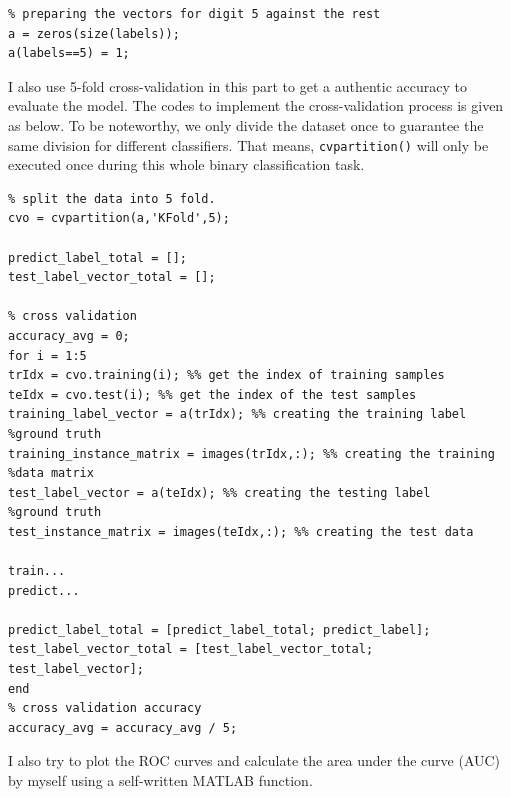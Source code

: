 \documentclass[a4paper,12pt]{article} %
\begin{document}
\begin{footnotesize}
\begin{verbatim}
% preparing the vectors for digit 5 against the rest
a = zeros(size(labels));
a(labels==5) = 1;
\end{verbatim}
\end{footnotesize}

\hspace{0.7cm}
I also use 5-fold cross-validation in this part to get a authentic accuracy to evaluate the model. The codes to implement the cross-validation process is given as below. To be noteworthy, we only divide the dataset once to guarantee the same division for different classifiers. That means, \texttt{cvpartition()} will only be executed once during this whole binary classification task.

\begin{footnotesize}
\begin{verbatim}
% split the data into 5 fold.
cvo = cvpartition(a,'KFold',5);

predict_label_total = [];
test_label_vector_total = [];

% cross validation
accuracy_avg = 0;
for i = 1:5
trIdx = cvo.training(i); %% get the index of training samples
teIdx = cvo.test(i); %% get the index of the test samples
training_label_vector = a(trIdx); %% creating the training label
%ground truth
training_instance_matrix = images(trIdx,:); %% creating the training
%data matrix
test_label_vector = a(teIdx); %% creating the testing label
%ground truth
test_instance_matrix = images(teIdx,:); %% creating the test data

train...
predict...

predict_label_total = [predict_label_total; predict_label];
test_label_vector_total = [test_label_vector_total; test_label_vector];
end
% cross validation accuracy
accuracy_avg = accuracy_avg / 5;
\end{verbatim}
\end{footnotesize}

\hspace{0.7cm}
I also try to plot the ROC curves and calculate the area under the curve (AUC) by myself using a self-written MATLAB function.
\end{document}
